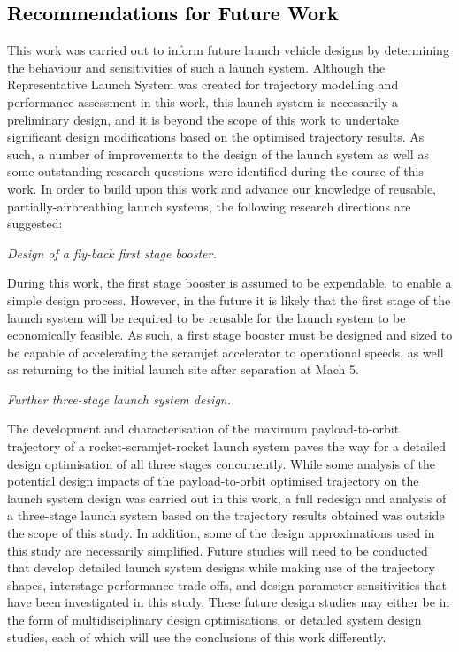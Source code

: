 \textcolor{black}{
  \chapter{Recommendations for Future Work}
}
\noindent  	
 This work was carried out to inform future launch vehicle designs by determining the behaviour and sensitivities of such a launch system. 
  Although the Representative Launch System was created for trajectory modelling and performance assessment in this work, this launch system is necessarily a preliminary design, and it is beyond the scope of this work to undertake significant design modifications based on the optimised trajectory results.
 As such, a number of improvements to the design of the launch system as well as some outstanding research questions were identified during the course of this work.
 In order to build upon this work and advance our knowledge of reusable, partially-airbreathing launch systems, the following research directions are suggested:


\vspace{10pt}
 \textit{Design of a fly-back first stage booster.}
 
 \noindent
 During this work, the first stage booster is assumed to be expendable, to enable a simple design process. However, in the future it is likely that the first stage of the launch system will be required to be reusable for the launch system to be economically feasible. As such, a first stage booster must be designed and sized to be capable of accelerating the scramjet accelerator to operational speeds, as well as returning to the initial launch site after separation at Mach 5. 

\vspace{10pt}
	\textit{Further three-stage launch system design.}

\noindent
The development and characterisation of the maximum payload-to-orbit trajectory of a rocket-scramjet-rocket launch system paves the way for a detailed design optimisation of all three stages concurrently.
While some analysis of the potential design impacts of the payload-to-orbit optimised trajectory on the launch system design was carried out in this work, a full redesign and analysis of a three-stage launch system based on the trajectory results obtained was outside the scope of this study. In addition, some of the design approximations used in this study are necessarily simplified. Future studies will need to be conducted that develop detailed launch system designs while making use of the trajectory shapes, interstage performance trade-offs, and design parameter sensitivities that have been investigated in this study. These future design studies may either be in the form of multidisciplinary design optimisations, or detailed system design studies, each of which will use the conclusions of this work differently. 

